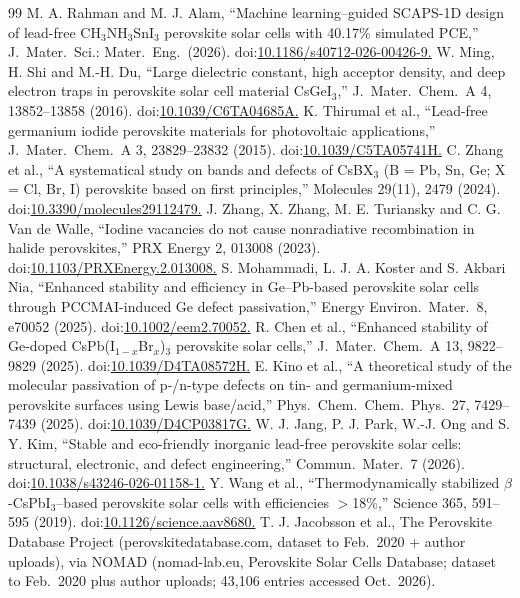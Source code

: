 \documentclass[aip,jap,amsmath,amssymb,preprint]{revtex4-2}
\begin{document}
\begin{thebibliography}{99}
 M. A. Rahman and M. J. Alam, ``Machine learning--guided SCAPS-1D design of lead-free CH$_{3}$NH$_{3}$SnI$_{3}$ perovskite solar cells with 40.17\% simulated PCE,'' J.\ Mater.\ Sci.: Mater.\ Eng.\ (2026). doi:\url{10.1186/s40712-026-00426-9.}
 W. Ming, H. Shi and M.-H. Du, ``Large dielectric constant, high acceptor density, and deep electron traps in perovskite solar cell material CsGeI$_{3}$,'' J.\ Mater.\ Chem.\ A 4, 13852--13858 (2016). doi:\url{10.1039/C6TA04685A.}
 K. Thirumal et al., ``Lead-free germanium iodide perovskite materials for photovoltaic applications,'' J.\ Mater.\ Chem.\ A 3, 23829--23832 (2015). doi:\url{10.1039/C5TA05741H.}
 C. Zhang et al., ``A systematical study on bands and defects of CsBX$_{3}$ (B = Pb, Sn, Ge; X = Cl, Br, I) perovskite based on first principles,'' Molecules 29(11), 2479 (2024). doi:\url{10.3390/molecules29112479.}
 J. Zhang, X. Zhang, M. E. Turiansky and C. G. Van de Walle, ``Iodine vacancies do not cause nonradiative recombination in halide perovskites,'' PRX Energy 2, 013008 (2023). doi:\url{10.1103/PRXEnergy.2.013008.}
 S. Mohammadi, L. J. A. Koster and S. Akbari Nia, ``Enhanced stability and efficiency in Ge--Pb-based perovskite solar cells through PCCMAI-induced Ge defect passivation,'' Energy Environ.\ Mater.\ 8, e70052 (2025). doi:\url{10.1002/eem2.70052.}
 R. Chen et al., ``Enhanced stability of Ge-doped CsPb(I$_{1-x}$Br$_{x}$)$_{3}$ perovskite solar cells,'' J.\ Mater.\ Chem.\ A 13, 9822--9829 (2025). doi:\url{10.1039/D4TA08572H.}
 E. Kino et al., ``A theoretical study of the molecular passivation of p-/n-type defects on tin- and germanium-mixed perovskite surfaces using Lewis base/acid,'' Phys.\ Chem.\ Chem.\ Phys.\ 27, 7429--7439 (2025). doi:\url{10.1039/D4CP03817G.}
 W. J. Jang, P. J. Park, W.-J. Ong and S. Y. Kim, ``Stable and eco-friendly inorganic lead-free perovskite solar cells: structural, electronic, and defect engineering,'' Commun.\ Mater.\ 7 (2026). doi:\url{10.1038/s43246-026-01158-1.}
 Y. Wang et al., ``Thermodynamically stabilized $\beta$-CsPbI$_{3}$--based perovskite solar cells with efficiencies $>$18\%,'' Science 365, 591--595 (2019). doi:\url{10.1126/science.aav8680.}
 T. J. Jacobsson et al., The Perovskite Database Project (perovskitedatabase.com, dataset to Feb.\ 2020 + author uploads), via NOMAD (nomad-lab.eu, Perovskite Solar Cells Database; dataset to Feb.\ 2020 plus author uploads; 43,106 entries accessed Oct.\ 2026).
\end{thebibliography}
\end{document}
